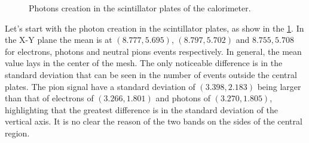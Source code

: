 \begin{figure}[htb!]
  \hspace{1em}

  \caption{Photons creation in the scintillator plates of the calorimeter.}\label{fig:photons-creation-scintillator}

\end{figure}

Let's start with the photon creation in the scintillator plates, as show in the
\cref{fig:photons-creation-scintillator}. In the X-Y plane the mean is at
\((8.777, 5.695)\), \((8.797, 5.702)\) and \(8.755, 5.708\) for electrons,
photons and neutral pions events respectively. In general, the mean value lays
in the center of the mesh. The only noticeable difference is in the standard
deviation that can be seen in the number of events outside the central plates.
The pion signal have a standard deviation of \((3.398, 2.183)\) being larger
than that of electrons of \((3.266, 1.801)\) and photons of \((3.270, 1.805)\),
highlighting that the greatest difference is in the standard deviation of the
vertical axis. It is no clear the reason of the two bands on the sides of the
central region.

